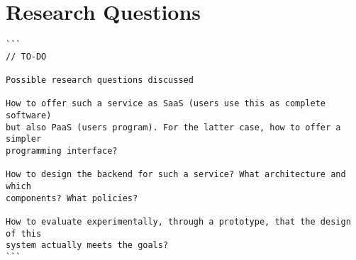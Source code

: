 \section{Research Questions}
\begin{verbatim}
```
// TO-DO

Possible research questions discussed

How to offer such a service as SaaS (users use this as complete software) 
but also PaaS (users program). For the latter case, how to offer a simpler
programming interface?

How to design the backend for such a service? What architecture and which
components? What policies?

How to evaluate experimentally, through a prototype, that the design of this
system actually meets the goals?
```
\end{verbatim}